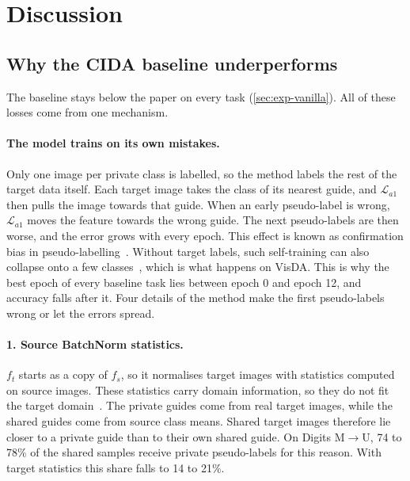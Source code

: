 \section{Discussion}\label{sec:discussion}

\subsection{Why the CIDA baseline underperforms}\label{sec:disc-baseline}
The baseline stays below the paper on every task (\cref{sec:exp-vanilla}).
All of these losses come from one mechanism.

\paragraph{The model trains on its own mistakes.}
Only one image per private class is labelled, so the method labels the rest of the target data itself.
Each target image takes the class of its nearest guide, and $\mathcal{L}_{a1}$ then pulls the image towards that guide.
When an early pseudo-label is wrong, $\mathcal{L}_{a1}$ moves the feature towards the wrong guide.
The next pseudo-labels are then worse, and the error grows with every epoch.
This effect is known as confirmation bias in pseudo-labelling~\citep{arazo2020pseudo}.
Without target labels, such self-training can also collapse onto a few classes~\citep{liang2020shot}, which is what happens on VisDA.
This is why the best epoch of every baseline task lies between epoch 0 and epoch 12, and accuracy falls after it.
Four details of the method make the first pseudo-labels wrong or let the errors spread.

\paragraph{1. Source BatchNorm statistics.}
$f_t$ starts as a copy of $f_s$, so it normalises target images with statistics computed on source images.
These statistics carry domain information, so they do not fit the target domain~\citep{li2018adabn}.
The private guides come from real target images, while the shared guides come from source class means.
Shared target images therefore lie closer to a private guide than to their own shared guide.
On Digits M$\to$U, 74 to 78\% of the shared samples receive private pseudo-labels for this reason.
With target statistics this share falls to 14 to 21\%.

